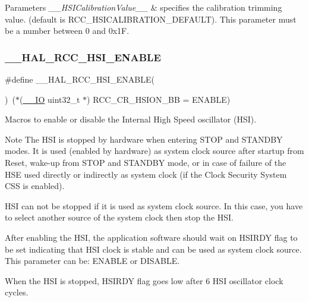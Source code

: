 \begin{DoxyParams}{Parameters}
{\em \+\_\+\+\_\+\+H\+S\+I\+Calibration\+Value\+\_\+\+\_\+} & specifies the calibration trimming value. (default is R\+C\+C\+\_\+\+H\+S\+I\+C\+A\+L\+I\+B\+R\+A\+T\+I\+O\+N\+\_\+\+D\+E\+F\+A\+U\+LT). This parameter must be a number between 0 and 0x1F. \\
\hline
\end{DoxyParams}
\mbox{\label{group___r_c_c___h_s_i___configuration_gaab944f562b53fc74bcc0e4958388fd42}} 
\subsubsection{\texorpdfstring{\+\_\+\+\_\+\+H\+A\+L\+\_\+\+R\+C\+C\+\_\+\+H\+S\+I\+\_\+\+E\+N\+A\+B\+LE}{\_\_HAL\_RCC\_HSI\_ENABLE}}
{\footnotesize\ttfamily \#define \+\_\+\+\_\+\+H\+A\+L\+\_\+\+R\+C\+C\+\_\+\+H\+S\+I\+\_\+\+E\+N\+A\+B\+LE(\begin{DoxyParamCaption}{ }\end{DoxyParamCaption})~($\ast$(\mbox{\hyperlink{core__sc300_8h_aec43007d9998a0a0e01faede4133d6be}{\+\_\+\+\_\+\+IO}} uint32\+\_\+t $\ast$) R\+C\+C\+\_\+\+C\+R\+\_\+\+H\+S\+I\+O\+N\+\_\+\+BB = E\+N\+A\+B\+LE)}



Macros to enable or disable the Internal High Speed oscillator (H\+SI). 

\begin{DoxyNote}{Note}
The H\+SI is stopped by hardware when entering S\+T\+OP and S\+T\+A\+N\+D\+BY modes. It is used (enabled by hardware) as system clock source after startup from Reset, wake-\/up from S\+T\+OP and S\+T\+A\+N\+D\+BY mode, or in case of failure of the H\+SE used directly or indirectly as system clock (if the Clock Security System C\+SS is enabled). 

H\+SI can not be stopped if it is used as system clock source. In this case, you have to select another source of the system clock then stop the H\+SI. 

After enabling the H\+SI, the application software should wait on H\+S\+I\+R\+DY flag to be set indicating that H\+SI clock is stable and can be used as system clock source. This parameter can be\+: E\+N\+A\+B\+LE or D\+I\+S\+A\+B\+LE. 

When the H\+SI is stopped, H\+S\+I\+R\+DY flag goes low after 6 H\+SI oscillator clock cycles. 
\end{DoxyNote}
